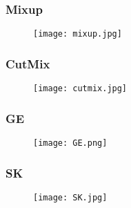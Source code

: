 \subsubsection{Mixup}
\begin{figure}[H]
	\centering
	\texttt{[image: mixup.jpg]}
\end{figure}

\subsubsection{CutMix}
\begin{figure}[H]
	\centering
	\texttt{[image: cutmix.jpg]}
\end{figure}

\subsubsection{GE}
\begin{figure}[H]
	\centering
	\texttt{[image: GE.png]}
\end{figure}

\subsubsection{SK}
\begin{figure}[H]
	\centering
	\texttt{[image: SK.jpg]}
\end{figure}


\newpage
